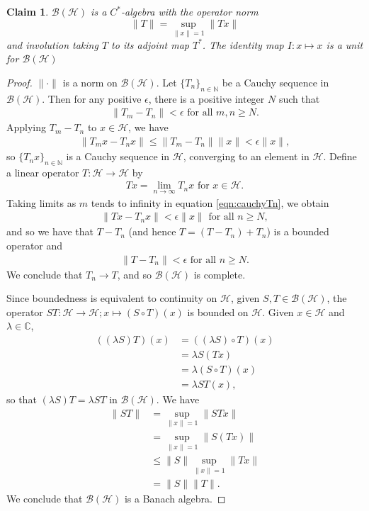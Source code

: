 \documentclass[12pt,a4paper]{report}
\theoremstyle{plain}
\newtheorem*{claim}{Claim}
\theoremstyle{definition}
\newcommand{\1}{\mathbbm{1}}
\newcommand{\C}{\mathbb{C}}
\newcommand{\N}{\mathbb{N}}
\renewcommand{\H}{\mathcal{H}}
\newcommand{\B}{\mathcal{B}}
\newcommand{\BH}{\mathcal{\B(\H)}}
\begin{document}
\begin{claim} $\B(\H)$ is a $C^\ast$-algebra with the operator norm 
\[
	\|T\|= \sup_{\|x\|=1}{\|Tx\|}
\]
and involution taking $T$ to its adjoint map $T^\ast$. 
The identity map $I:x\mapsto x$ is a unit for $\BH$
\end{claim}
\begin{proof}
	$\|\cdot\|$ is a norm on $\BH$. Let $\{T_n\}_{n\in\N}$ be a Cauchy sequence 
	in $\BH$. Then for any positive $\epsilon$, there is a positive integer $N$ such that 
	\begin{align*}
		\|T_m-T_n\| < \epsilon \mbox{ for all } m,n \geq N.
	\end{align*}
	Applying $T_m-T_n$ to $x \in \H$, we have 
	\begin{align}\label{eqn:cauchyTn}
		\|T_mx-T_nx\| \leq \|T_m-T_n\| \|x\| < \epsilon \|x\|,
	\end{align}
	so $\{T_nx\}_{n\in\N}$ is a Cauchy sequence in $\H$, converging to an element in $\H$.
	Define a linear operator $T:\H \to \H$ by 
	\begin{align*}
		Tx= \lim_{n\to\infty}{T_nx} \mbox{ for } x \in \H.
	\end{align*}
	Taking limits as $m$ tends to infinity in equation \eqref{eqn:cauchyTn}, we obtain
	\begin{align*}
		\|Tx-T_nx\| < \epsilon \|x\| \mbox{ for all }n \geq N,
	\end{align*}
	and so we have that $T-T_n$ (and hence $T=(T-T_n)+T_n$) is a bounded operator and  
	\begin{align*}
		\|T-T_n\| <\epsilon \mbox{ for all }n \geq N.
	\end{align*}
	We conclude that $T_n \to T$, and so $\BH$ is complete.
	
	Since boundedness is equivalent to continuity on $\H$, given $S,T\in\BH$, the operator 
	$ST:\H \to \H; x \mapsto (S\circ T)(x)$ is bounded on $\H$.
	Given $x\in\H$ and $\lambda\in\C$, 
	\begin{align*}
			((\lambda S)T)(x)
		&=	((\lambda S)\circ T)(x)												\\
		&=	\lambda S(Tx)														\\
		&=	\lambda (S\circ T)(x)												\\
		&=	\lambda ST(x),
	\end{align*} 
	so that $(\lambda S)T = \lambda ST$ in $\BH$. We have 
	\begin{align*}
				\|ST\|
		&=		\sup_{\|x\|=1}{\|STx\|} 										\\
		&=		\sup_{\|x\|=1}{\|S(Tx)\|} 										\\
		&\leq	\|S\| \sup_{\|x\|=1}{\|Tx\|} 									\\
		&=		\|S\| \|T\|.
	\end{align*}
	We conclude that $\BH$ is a Banach algebra.
	

\end{proof}
\end{document}
